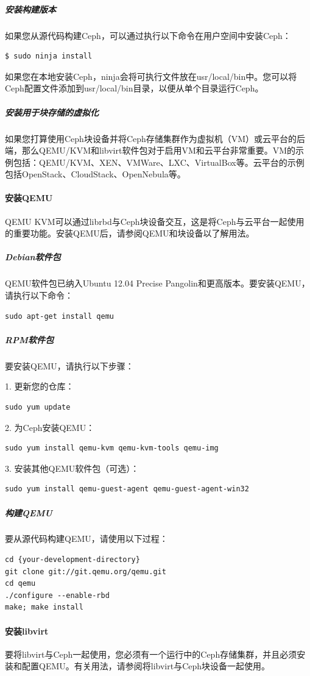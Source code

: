 \documentclass[12pt,UTF8]{ctexbook}
\begin{document}
\subparagraph{安装构建版本}
如果您从源代码构建Ceph，可以通过执行以下命令在用户空间中安装Ceph：
\begin{verbatim}
$ sudo ninja install
\end{verbatim}

如果您在本地安装Ceph，ninja会将可执行文件放在usr/local/bin中。您可以将Ceph配置文件添加到usr/local/bin目录，以便从单个目录运行Ceph。

\subparagraph{安装用于块存储的虚拟化}
如果您打算使用Ceph块设备并将Ceph存储集群作为虚拟机（VM）或云平台的后端，那么QEMU/KVM和libvirt软件包对于启用VM和云平台非常重要。VM的示例包括：QEMU/KVM、XEN、VMWare、LXC、VirtualBox等。云平台的示例包括OpenStack、CloudStack、OpenNebula等。

\paragraph{安装QEMU}
QEMU KVM可以通过librbd与Ceph块设备交互，这是将Ceph与云平台一起使用的重要功能。安装QEMU后，请参阅QEMU和块设备以了解用法。

\subparagraph{Debian软件包}
QEMU软件包已纳入Ubuntu 12.04 Precise Pangolin和更高版本。要安装QEMU，请执行以下命令：
\begin{verbatim}
sudo apt-get install qemu
\end{verbatim}

\subparagraph{RPM软件包}
要安装QEMU，请执行以下步骤：

1. 更新您的仓库：
\begin{verbatim}
sudo yum update
\end{verbatim}

2. 为Ceph安装QEMU：
\begin{verbatim}
sudo yum install qemu-kvm qemu-kvm-tools qemu-img
\end{verbatim}

3. 安装其他QEMU软件包（可选）：
\begin{verbatim}
sudo yum install qemu-guest-agent qemu-guest-agent-win32
\end{verbatim}

\subparagraph{构建QEMU}
要从源代码构建QEMU，请使用以下过程：
\begin{verbatim}
cd {your-development-directory}
git clone git://git.qemu.org/qemu.git
cd qemu
./configure --enable-rbd
make; make install
\end{verbatim}

\paragraph{安装libvirt}
要将libvirt与Ceph一起使用，您必须有一个运行中的Ceph存储集群，并且必须安装和配置QEMU。有关用法，请参阅将libvirt与Ceph块设备一起使用。
\end{document}
